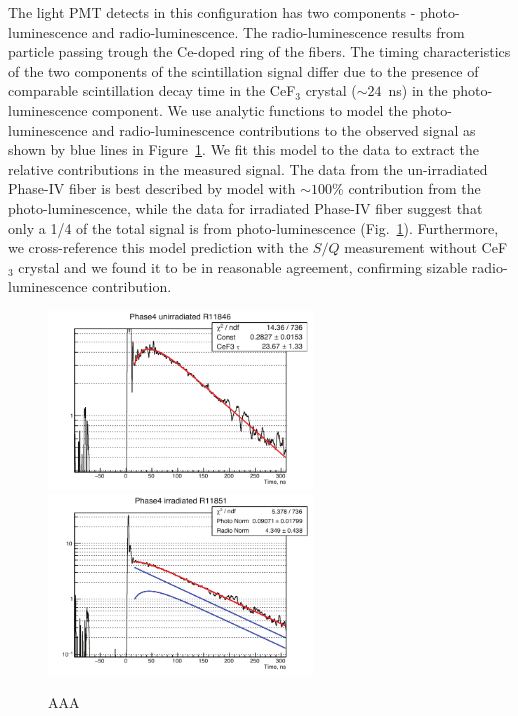 \documentclass[a4paper,11pt]{article}
\begin{document}
The light PMT detects in this configuration has two components - photo-luminescence and radio-luminescence. The radio-luminescence results from particle passing trough the Ce-doped ring of the fibers. The timing characteristics of the two components of the scintillation signal differ due to the presence of comparable scintillation decay time in the CeF$_3$ crystal ($\sim24$~ns) in the photo-luminescence component. We use analytic functions to model the photo-luminescence and radio-luminescence contributions to the observed signal as shown by blue lines in Figure~\ref{fig:CeF3signals}. We fit this model to the data to extract the relative contributions in the measured signal. The data from the un-irradiated Phase-IV fiber is best described by model with $\sim100$\% contribution from the photo-luminescence, while the data for irradiated Phase-IV fiber suggest that only a 1/4 of the total signal is from  photo-luminescence (Fig.~\ref{fig:CeF3signals}). Furthermore, we cross-reference this model prediction with the $S/Q$ measurement without CeF$_3$ crystal and we found it to be in reasonable agreement, confirming sizable radio-luminescence contribution. 
\begin{figure}[ht]
\begin{center}
        \includegraphics[width=7cm]{Figures/CeF3coupledFibersUnirrad.pdf}
        \includegraphics[width=7cm]{Figures/CeF3coupledFibersIrrad.pdf}
    \caption{\small AAA}
    \label{fig:CeF3signals}
\end{center}
\end{figure}
\end{document}
